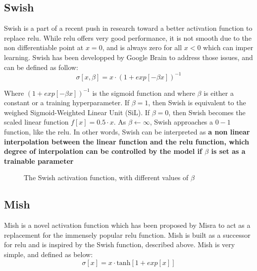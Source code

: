 \subsection{Swish}
Swish\cite{swish} is a part of a recent push in research toward a better activation function to replace \gls{relu}. While \gls{relu} offers very good performance, it is not smooth due to the non differentiable point at $x = 0$, and is always zero for all $x < 0$ which can imper learning. Swish has been developped by Google Brain to address those issues, and can be defined as follow:
\begin{equation}
	\sigma[x, \beta] = x \cdot (1 + exp[-\beta x])^{-1}
\end{equation}

Where $(1 + exp[-\beta x])^{-1}$ is the sigmoid function and where $\beta$ is either a constant or a training \gls{hyperparameter}. If $\beta = 1$, then Swish is equivalent to the weighed Sigmoid-Weighted Linear Unit (SiL). If $\beta = 0$, then Swish becomes the scaled linear function $f[x] = 0.5 \cdot x$. As $\beta \leftarrow \infty$, Swish approaches a $0-1$ function, like the \gls{relu}. In other words, Swish can be interpreted as \textbf{a non linear interpolation between the linear function and the \gls{relu} function, which degree of interpolation can be controlled by the model if $\beta$ is set as a trainable parameter}
	\begin{figure}[H]
		\centering
		
			\caption{The Swish activation function, with different values of $\beta$}
			  \label{fig:swish}
	\end{figure}

\subsection{Mish}
Mish is a novel activation function which has been proposed by Misra\cite{mish} to act as a replacement for the immensely popular \gls{relu} function.  Mish is built as a successor for \gls{relu} and is inspired by the Swish function, described above. Mish is very simple, and defined as below: 
\begin{equation}
	\sigma[x] = x \cdot \text{tanh}[1 + exp[x]]
\end{equation}

